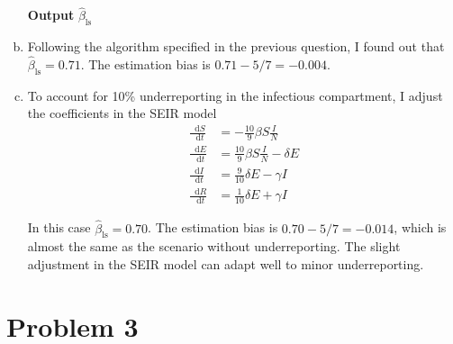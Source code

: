 \documentclass[12pt]{article}
\newcommand*\diff{\mathop{}\!\mathrm{d}}
\begin{document}
\begin{enumerate}[(a)]
\begin{algorithm}[htbp]
	\hspace*{\algorithmicindent} \textbf{Output} $\hat{\beta}_\text{ls}$
\end{algorithm}

	\item Following the algorithm specified in the previous question, I found out that $\hat{\beta}_\text{ls} = 0.71$. The estimation bias is $0.71 - 5/7 = -0.004$. 

	
	
	\item To account for 10\% underreporting in the infectious compartment, I adjust the coefficients in the SEIR model
	\begin{align*}
	\frac{\diff S}{\diff t} &= -\frac{10}{9} \beta S \frac{I}{N}\\
	\frac{\diff E}{\diff t} &= \frac{10}{9}\beta S \frac{I}{N} - \delta E\\
	\frac{\diff I}{\diff t} &= \frac{9}{10}\delta E - \gamma I\\
	\frac{\diff R}{\diff t} &= \frac{1}{10}\delta E + \gamma I
	\end{align*}
	
	In this case $\hat{\beta}_\text{ls} = 0.70$. The estimation bias is $0.70 - 5/7 = -0.014$, which is almost the same as the scenario without underreporting. The slight adjustment in the SEIR model can adapt well to minor underreporting. 
	
	
\end{enumerate}


\section*{Problem 3}
\end{document}
